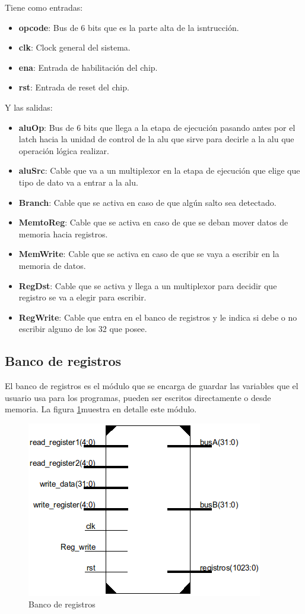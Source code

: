 Tiene como entradas:
\begin{itemize}
  \item \textbf{opcode}: Bus de 6 bits que es la parte alta de la isntrucci\'on.
  \item \textbf{clk}: Clock general del sistema.
  \item \textbf{ena}: Entrada de habilitaci\'on del chip.
  \item \textbf{rst}: Entrada de reset del chip.
\end{itemize}

Y las salidas:
\begin{itemize}
  \item \textbf{aluOp}: Bus de 6 bits que llega a la etapa de ejecuci\'on pasando antes por el latch hacia la unidad de control de la alu que sirve para decirle a la alu que operaci\'on l\'ogica realizar.
  \item \textbf{aluSrc}: Cable que va a un multiplexor en la etapa de ejecuci\'on que elige que tipo de dato va a entrar a la alu.
  \item \textbf{Branch}: Cable que se activa en caso de que alg\'un salto sea detectado.
  \item \textbf{MemtoReg}: Cable que se activa en caso de que se deban mover datos de memoria hacia registros.
  \item \textbf{MemWrite}: Cable que se activa en caso de que se vaya a escribir en la memoria de datos.
  \item \textbf{RegDst}: Cable que se activa y llega a un multiplexor para decidir que registro se va a elegir para escribir.
  \item \textbf{RegWrite}: Cable que entra en el banco de registros y le indica si debe o no escribir alguno de los 32 que posee. 	
\end{itemize}

\subsection{Banco de registros}
El banco de registros es el m\'odulo que se encarga de guardar las variables que el usuario usa para los programas, pueden ser escritos directamente o desde memoria. La figura \ref{fig:registros}muestra en detalle este m\'odulo.

\begin{figure}[H]
\centering
\includegraphics[scale=0.5]{img/banco_registros}
\caption{Banco de registros}
\label{fig:registros}
\end{figure} 

